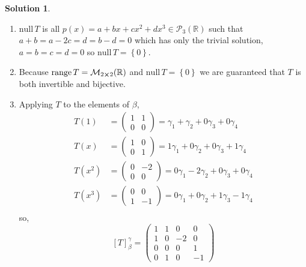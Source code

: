 \documentclass[10pt]{article}
\theoremstyle{definition}
\newtheorem{soln}{Solution}
\begin{document}
\begin{soln}~
  \begin{enumerate}[label=(\alph*)]
    \item $\text{null}\,T$ is all $p(x)=a+bx+cx^2+dx^3\in \mathcal{P}_3(\mathbb{R})$ such that $a+b=a-2c=d=b-d=0$ which has only the trivial solution,
          $a=b=c=d=0$ so $\text{null}\,T=\left\{0\right\}$.
    \item Because $\text{range}\, T=\mathcal{M}_{2\cross 2}(\mathbb{R})$ and $\text{null}\,T=\left\{0\right\}$ we are guaranteed that $T$ is both invertible and
          bijective.
    \item Applying $T$ to the elements of $\beta$,
          \begin{align*}
            T(1)   & =\begin{pmatrix}
                        1 & 1 \\
                        0 & 0
                      \end{pmatrix}=\gamma_1+\gamma_2+0\gamma_3+0\gamma_4   \\
            T(x)   & =\begin{pmatrix}
                        1 & 0 \\
                        0 & 1
                      \end{pmatrix}=1\gamma_1+0\gamma_2+0\gamma_3+1\gamma_4 \\
            T(x^2) & =\begin{pmatrix}
                        0 & -2 \\
                        0 & 0
                      \end{pmatrix}=0\gamma_1-2\gamma_2+0\gamma_3+0\gamma_4 \\
            T(x^3) & =\begin{pmatrix}
                        0 & 0  \\
                        1 & -1
                      \end{pmatrix}=0\gamma_1+0\gamma_2+1\gamma_3-1\gamma_4 \\
          \end{align*}
          so,
          $$\left[T\right]_\beta^\gamma=\begin{pmatrix}
              1 & 1 & 0  & 0  \\
              1 & 0 & -2 & 0  \\
              0 & 0 & 0  & 1  \\
              0 & 1 & 0  & -1
            \end{pmatrix}
$$
\end{enumerate}
\end{soln}
\end{document}
